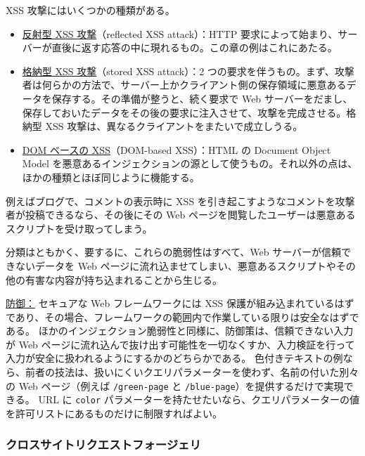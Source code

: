 \documentclass[uplatex]{jsarticle}
\def\label#1{}%
\begin{document}
\begin{dfn}\label{dfn:ch11-xss-kinds}
XSS 攻撃にはいくつかの種類がある。
\begin{itemize}
\item \underline{反射型 XSS 攻撃}（reflected XSS attack）：HTTP 要求によって始まり、サーバーが直後に返す応答の中に現れるもの。この章の例はこれにあたる。
\item \underline{格納型 XSS 攻撃}（stored XSS attack）：2 つの要求を伴うもの。まず、攻撃者は何らかの方法で、サーバー上かクライアント側の保存領域に悪意あるデータを保存する。その準備が整うと、続く要求で Web サーバーをだまし、保存しておいたデータをその後の要求に注入させて、攻撃を完成させる。格納型 XSS 攻撃は、異なるクライアントをまたいで成立しうる。
\item \underline{DOM ベースの XSS}（DOM-based XSS）：HTML の Document Object Model を悪意あるインジェクションの源として使うもの。それ以外の点は、ほかの種類とほぼ同じように機能する。
\end{itemize}
\end{dfn}

\begin{exa}\label{exa:ch11-stored-xss-blog}
例えばブログで、コメントの表示時に XSS を引き起こすようなコメントを攻撃者が投稿できるなら、その後にその Web ページを閲覧したユーザーは悪意あるスクリプトを受け取ってしまう。
\end{exa}

分類はともかく、要するに、これらの脆弱性はすべて、Web サーバーが信頼できないデータを Web ページに流れ込ませてしまい、悪意あるスクリプトやその他の有害な内容が持ち込まれることから生じる。

\underline{防御：}
セキュアな Web フレームワークには XSS 保護が組み込まれているはずであり、その場合、フレームワークの範囲内で作業している限りは安全なはずである。
ほかのインジェクション脆弱性と同様に、防御策は、信頼できない入力が Web ページに流れ込んで抜け出す可能性を一切なくすか、入力検証を行って入力が安全に扱われるようにするかのどちらかである。
色付きテキストの例なら、前者の技法は、扱いにくいクエリパラメーターを使わず、名前の付いた別々の Web ページ（例えば \texttt{/green-page} と \texttt{/blue-page}）を提供するだけで実現できる。
URL に \texttt{color} パラメーターを持たせたいなら、クエリパラメーターの値を許可リストにあるものだけに制限すればよい。

\subsubsection{クロスサイトリクエストフォージェリ}\label{subsec:ch11-csrf}
\end{document}
